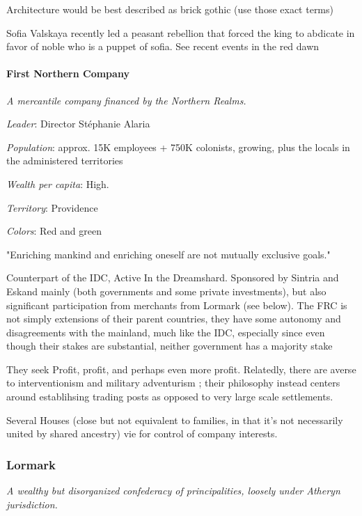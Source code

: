 Architecture would be best described as brick gothic (use those exact terms)

Sofia Valskaya recently led a peasant rebellion that forced the king to abdicate in favor of noble who is a puppet of sofia. See recent events in the red dawn

\paragraph{First Northern Company}


\textit{A mercantile company financed by the Northern Realms.}

\textit{Leader}: Director Stéphanie Alaria

\textit{Population}: approx. 15K employees + 750K colonists, growing, plus the locals in the administered territories

\textit{Wealth per capita}: High.

\textit{Territory}: Providence
    
\textit{Colors}: Red and green


\begin{rpg-quotebox}
"Enriching mankind and enriching oneself are not mutually exclusive goals."
\end{rpg-quotebox}


Counterpart of the IDC, Active In the Dreamshard. Sponsored by Sintria and Eskand mainly (both governments and some private investments), but also significant participation from merchants from Lormark (see below).  
The FRC is not simply extensions of their parent countries, they have some autonomy and disagreements with the mainland, much like the IDC, especially since even though their stakes are substantial, neither government has a majority stake

They seek Profit, profit, and perhaps even more profit. Relatedly, there are averse to interventionism and military adventurism ; their philosophy instead centers around establihsing trading posts as opposed to very large scale settlements.

Several Houses (close but not equivalent to families, in that it's not necessarily united by shared ancestry) vie for control of company interests.



\subsubsection{Lormark}

\textit{A wealthy but disorganized confederacy of principalities, loosely under Atheryn jurisdiction.}

